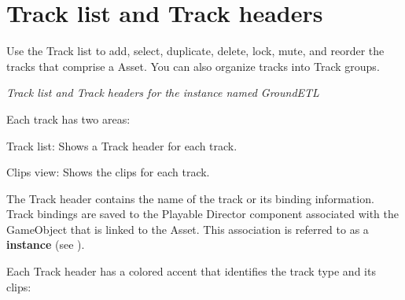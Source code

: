 \chapter{Track list and Track headers}
\hypertarget{md__library_2_package_cache_2com_8unity_8timeline_0d1_87_86_2_documentation_0i_2trk__list__about}{}\label{md__library_2_package_cache_2com_8unity_8timeline_0d1_87_86_2_documentation_0i_2trk__list__about}
\label{md__library_2_package_cache_2com_8unity_8timeline_0d1_87_86_2_documentation_0i_2trk__list__about_autotoc_md1259}%
%
 Use the Track list to add, select, duplicate, delete, lock, mute, and reorder the tracks that comprise a  Asset. You can also organize tracks into Track groups.



{\itshape Track list and Track headers for the  instance named Ground\+ETL}

Each track has two areas\+:


\begin{DoxyItemize}
\item Track list\+: Shows a Track header for each track.
\item Clips view\+: Shows the clips for each track.
\end{DoxyItemize}

The Track header contains the name of the track or its binding information. Track bindings are saved to the Playable Director component associated with the Game\+Object that is linked to the  Asset. This association is referred to as a {\bfseries{ instance}} (see ).

Each Track header has a colored accent that identifies the track type and its clips\+:


